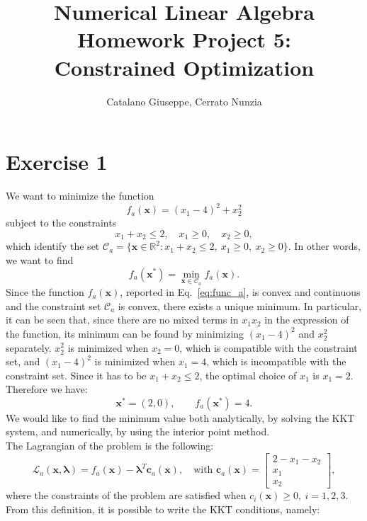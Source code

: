 \documentclass[a4paper,11pt]{article}
\newcommand{\R}{\mathbb{R}}
\begin{document}
	\author{Catalano Giuseppe, Cerrato Nunzia}
	\title{Numerical Linear Algebra Homework Project 5:\\Constrained Optimization}
	\date{}
	\maketitle

\section*{Exercise 1}
We want to minimize the function
\begin{equation}
	f_a(\textbf{x}) = (x_{1}-4)^2 + x_{2}^{2}
	\label{eq:func_a}
\end{equation}
subject to the constraints
\begin{equation}
	x_{1} + x_{2} \le 2, \quad x_{1} \ge 0, \quad x_{2} \ge 0,
	\label{eq:constr_a}
\end{equation}
which identify the set $\mathcal{C}_a = \{ \textbf{x} \in \R^2 : x_{1} + x_{2} \le 2, \ x_{1} \ge 0, \ x_{2} \ge 0 \}$. In other words, we want to find 
\begin{equation}
	f_a(\textbf{x}^*) = \min_{\textbf{x} \in \mathcal{C}_a} f_a(\textbf{x}).
\end{equation}
\noindent Since the function $f_a(\textbf{x})$, reported in Eq.~\eqref{eq:func_a}, is convex and continuous and the constraint set $\mathcal{C}_a$ is convex, there exists a unique minimum. In particular, it can be seen that, since there are no mixed terms in $x_1 x_2$ in the expression of the function, its minimum can be found by minimizing $(x_{1}-4)^2$ and $x_{2}^{2}$ separately. $x_{2}^{2}$ is minimized when $x_{2} = 0$, which is compatible with the constraint set, and $(x_{1}-4)^2$ is minimized when $ x_{1} = 4$, which is incompatible with the constraint set. Since it has to be $x_{1} + x_{2} \le 2$, the optimal choice of $x_1$ is $x_1 = 2$. Therefore we have:
\begin{equation}
	\textbf{x}^* = (2,0),\qquad  f_a(\textbf{x}^*) = 4.
\end{equation}
\noindent We would like to find the minimum value both analytically, by solving the KKT system, and numerically, by using the interior point method.\\

\noindent The Lagrangian of the problem is the following:
\begin{equation}
	\mathcal{L}_a(\textbf{x},\boldsymbol{\lambda}) = f_a(\textbf{x}) - \boldsymbol{\lambda}^T \textbf{c}_a(\textbf{x}), \quad \text{with } \textbf{c}_a(\textbf{x}) = \begin{bmatrix}
		2 - x_1 - x_2\\
		x_1\\
		x_2
	\end{bmatrix},
\end{equation}
where the constraints of the problem are satisfied when $c_i(\textbf{x})\ge 0,\ i = 1,2,3$. From this definition, it is possible to write the KKT conditions, namely:
 
\end{document}
